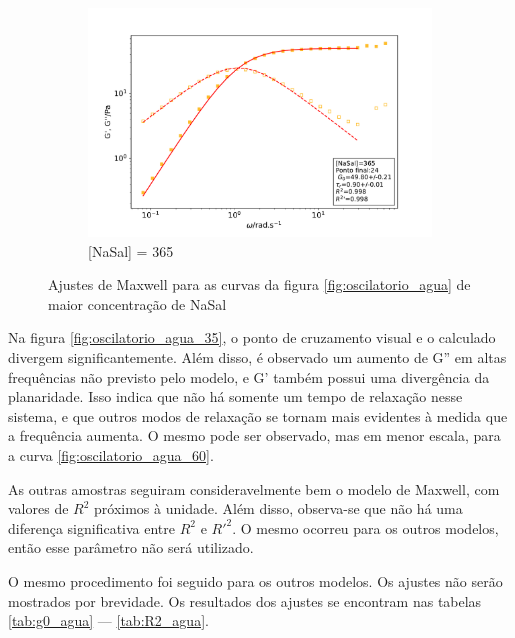 \begin{figure}[h]
			\begin{subfigure}[t]{0.5\textwidth}
				\includegraphics[width=\textwidth]{imagens/reologia/oscilatorio_agua_365}
				\caption{[NaSal] = 365\mM}
				\label{fig:oscilatorio_agua_365}
			\end{subfigure}
		
			\caption{Ajustes de Maxwell para as curvas da figura \ref{fig:oscilatorio_agua} de maior concentração de NaSal}
			\label{fig:oscilatorio_agua_maxwell2}
		\end{figure}
	
		Na figura \ref{fig:oscilatorio_agua_35}, o ponto de cruzamento visual e o calculado divergem significantemente. Além disso, é observado um aumento de G'' em altas frequências não previsto pelo modelo, e G' também possui uma divergência da planaridade. Isso indica que não há somente um tempo de relaxação nesse sistema, e que outros modos de relaxação se tornam mais evidentes à medida que a frequência aumenta. O mesmo pode ser observado, mas em menor escala, para a curva \ref{fig:oscilatorio_agua_60}. %
		
		As outras amostras seguiram consideravelmente bem o modelo de Maxwell, com valores de \(R^2\) próximos à unidade. Além disso, observa-se que não há uma diferença significativa entre \(R^2\) e \(R\mathrm{'}^2\). O mesmo ocorreu para os outros modelos, então esse parâmetro não será utilizado.
		
		O mesmo procedimento foi seguido para os outros modelos. Os ajustes não serão mostrados por brevidade. Os resultados dos ajustes se encontram nas tabelas \ref{tab:g0_agua} --- \ref{tab:R2_agua}.
		
